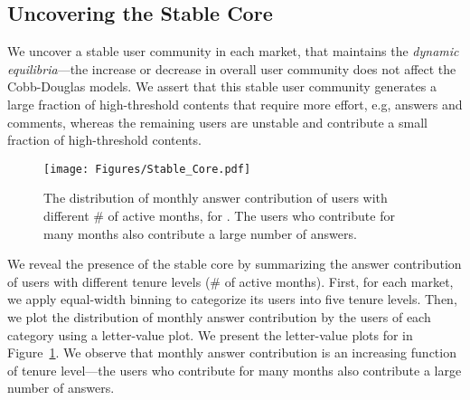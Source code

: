 \subsection{Uncovering the Stable Core} 
We uncover a stable user community in each  market, that maintains the \emph{dynamic equilibria}---the increase or decrease in overall user community does not affect the Cobb-Douglas models. We assert that this stable user community generates a large fraction of high-threshold contents that require more effort, e.g, answers and comments, whereas the remaining users are unstable and contribute a small fraction of high-threshold contents.

\begin{figure}[t]
\centering
\texttt{[image: Figures/Stable\_Core.pdf]}
\caption{The distribution of monthly answer contribution of users with different \# of active months, for . The users who contribute for many months also contribute a large number of answers.}
\label{fig:stable_core}
\end{figure}

We reveal the presence of the stable core by summarizing the answer contribution of users with different tenure levels (\# of active months). First, for each  market, we apply equal-width binning to categorize its users into five tenure levels. Then, we plot the distribution of monthly answer contribution by the users of each category using a letter-value plot. We present the letter-value plots for  in Figure~\ref{fig:stable_core}. We observe that monthly answer contribution is an increasing function of tenure level---the users who contribute for many months also contribute a large number of answers.


